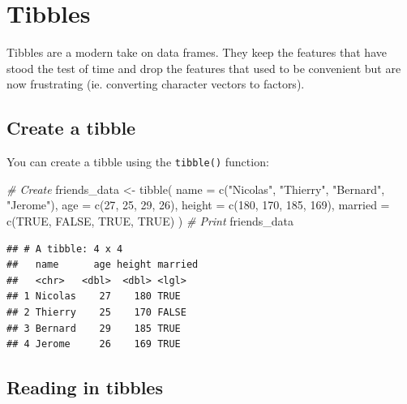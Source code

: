 \documentclass[
]{book}
\newenvironment{Shaded}{\begin{snugshade}}{\end{snugshade}}
\newcommand{\AttributeTok}[1]{\textcolor[rgb]{0.77,0.63,0.00}{#1}}
\newcommand{\CommentTok}[1]{\textcolor[rgb]{0.56,0.35,0.01}{\textit{#1}}}
\newcommand{\ConstantTok}[1]{\textcolor[rgb]{0.00,0.00,0.00}{#1}}
\newcommand{\DecValTok}[1]{\textcolor[rgb]{0.00,0.00,0.81}{#1}}
\newcommand{\FunctionTok}[1]{\textcolor[rgb]{0.00,0.00,0.00}{#1}}
\newcommand{\NormalTok}[1]{#1}
\newcommand{\OtherTok}[1]{\textcolor[rgb]{0.56,0.35,0.01}{#1}}
\newcommand{\StringTok}[1]{\textcolor[rgb]{0.31,0.60,0.02}{#1}}
\begin{document}
\hypertarget{tibbles}{%
\section{Tibbles}\label{tibbles}}

Tibbles are a modern take on data frames. They keep the features that have stood the test of time and drop the features that used to be convenient but are now frustrating (ie. converting character vectors to factors).

\hypertarget{create-a-tibble}{%
\subsection*{Create a tibble}\label{create-a-tibble}}

You can create a tibble using the \texttt{tibble()} function:

\begin{Shaded}
\begin{Highlighting}[]
\CommentTok{\# Create}
\NormalTok{friends\_data }\OtherTok{\textless{}{-}} \FunctionTok{tibble}\NormalTok{(}
  \AttributeTok{name =} \FunctionTok{c}\NormalTok{(}\StringTok{"Nicolas"}\NormalTok{, }\StringTok{"Thierry"}\NormalTok{, }\StringTok{"Bernard"}\NormalTok{, }\StringTok{"Jerome"}\NormalTok{),}
  \AttributeTok{age =} \FunctionTok{c}\NormalTok{(}\DecValTok{27}\NormalTok{, }\DecValTok{25}\NormalTok{, }\DecValTok{29}\NormalTok{, }\DecValTok{26}\NormalTok{),}
  \AttributeTok{height =} \FunctionTok{c}\NormalTok{(}\DecValTok{180}\NormalTok{, }\DecValTok{170}\NormalTok{, }\DecValTok{185}\NormalTok{, }\DecValTok{169}\NormalTok{),}
  \AttributeTok{married =} \FunctionTok{c}\NormalTok{(}\ConstantTok{TRUE}\NormalTok{, }\ConstantTok{FALSE}\NormalTok{, }\ConstantTok{TRUE}\NormalTok{, }\ConstantTok{TRUE}\NormalTok{)}
\NormalTok{)}
\CommentTok{\# Print}
\NormalTok{friends\_data}
\end{Highlighting}
\end{Shaded}

\begin{verbatim}
## # A tibble: 4 x 4
##   name      age height married
##   <chr>   <dbl>  <dbl> <lgl>  
## 1 Nicolas    27    180 TRUE   
## 2 Thierry    25    170 FALSE  
## 3 Bernard    29    185 TRUE   
## 4 Jerome     26    169 TRUE
\end{verbatim}

\hypertarget{reading-in-tibbles}{%
\subsection*{Reading in tibbles}\label{reading-in-tibbles}}
\end{document}
